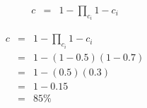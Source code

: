 \documentclass{slides}
\title{}
\author{}
\date{} %
\begin{document}
\maketitle

\begin{eqnarray*}
c	& =	& 1 - \prod_{c_i} 1-c_i
\end{eqnarray*}

\newpage

\begin{eqnarray*}
c	& =	& 1 - \prod_{c_i} 1-c_i \\
	& =	& 1 - (1 - 0.5) (1 - 0.7) \\
	& =	& 1 - (0.5) (0.3) \\
	& =	& 1 - 0.15 \\
	& =	& 85\%
\end{eqnarray*}
\end{document}
